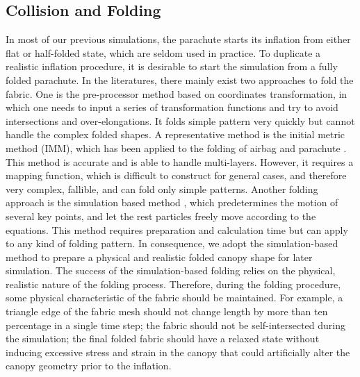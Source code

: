 \subsection{Collision and Folding}
In most of our previous simulations, the parachute starts its inflation from either flat or half-folded state, which are seldom used in practice. To duplicate a realistic inflation procedure, it is desirable to start the simulation from a fully folded parachute. In the literatures, there mainly exist two approaches to fold the fabric. One is the pre-processor method based on coordinates transformation, in which one needs to input a series of transformation functions and try to avoid intersections and over-elongations. It folds simple pattern very quickly but cannot handle the complex folded shapes. A representative method is the initial metric method (IMM), which has been applied to the folding of airbag \cite{Tanavde1995Airbag, Zhang2005Airbag} and parachute \cite{Chen2013Folded}. This method is accurate and is able to handle multi-layers. However, it requires a mapping function, which is difficult to construct for general cases, and therefore very complex, fallible, and can fold only simple patterns. Another folding approach is the simulation based method \cite{Hayashi2013Jfold, Hayashi2014Simulation, Taylor2015Using}, which predetermines the motion of several key points, and let the rest particles freely move according to the equations. This method requires preparation and calculation time but can apply to any kind of folding pattern. In consequence, we adopt the simulation-based method to prepare a physical and realistic folded canopy shape for later simulation. The success of the simulation-based folding relies on the physical, realistic nature of the folding process. Therefore, during the folding procedure, some physical characteristic of the fabric should be maintained. For example, a triangle edge of the fabric mesh should not change length by more than ten percentage in a single time step\cite{Caramana1999Construction}; the fabric should not be self-intersected during the simulation\cite{Bridson2005Robust}; the final folded fabric should have a relaxed state without inducing excessive stress and strain in the canopy that could artificially alter the canopy geometry prior to the inflation\cite{Tutt2011Finite}.

